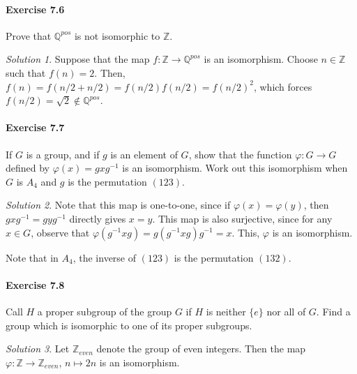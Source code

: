 \documentclass[11pt]{report}
\def\Q{\mathbb{Q}}
\def\Z{\mathbb{Z}}
\theoremstyle{remark}
\newtheorem*{solution}{Solution}
\begin{document}
    \paragraph{Exercise 7.6} Prove that $\Q^{pos}$ is not isomorphic to $\Z$.
    \begin{solution}
        Suppose that the map $f\colon \Z \to \Q^{pos}$ is an isomorphism. Choose $n
        \in \Z$ such that $f(n) = 2$. Then, $f(n) = f(n / 2 + n / 2) = f(n / 2)f(n /
        2) = f(n / 2)^2$, which forces $f(n / 2) = \sqrt{2} \notin \Q^{pos}$.
    \end{solution}

    \paragraph{Exercise 7.7} If $G$ is a group, and if $g$ is an element of $G$,
    show that the function $\varphi\colon G \to G$ defined by $\varphi(x) =
    gxg^{-1}$ is an isomorphism. Work out this isomorphism when $G$ is $A_4$ and $g$
    is the permutation $(123)$.
    \begin{solution}
        Note that this map is one-to-one, since if $\varphi(x) = \varphi(y)$, then
        $gxg^{-1} = gyg^{-1}$ directly gives $x = y$. This map is also surjective,
        since for any $x \in G$, observe that $\varphi(g^{-1}xg) = g(g^{-1}xg)g^{-1}
        = x$. This, $\varphi$ is an isomorphism.

        Note that in $A_4$, the inverse of $(123)$ is the permutation $(132)$.
    \end{solution}


    \paragraph{Exercise 7.8} Call $H$ a proper subgroup of the group $G$ if $H$ is
    neither $\{e\}$ nor all of $G$. Find a group which is isomorphic to one of its
    proper subgroups.
    \begin{solution}
        Let $\Z_{even}$ denote the group of even integers. Then the map
        $\varphi\colon \Z \to \Z_{even}$, $n \mapsto 2n$ is an isomorphism.
    \end{solution}
    
\end{document}
